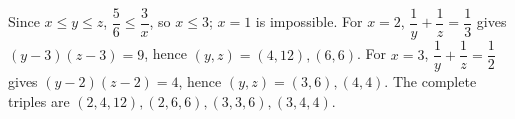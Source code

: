 Since $x\le y\le z$, $\dfrac{5}{6}\le\dfrac{3}{x}$, so $x\le3$; $x=1$ is impossible. For $x=2$, $\dfrac{1}{y}+\dfrac{1}{z}=\dfrac{1}{3}$ gives $(y-3)(z-3)=9$, hence $(y,z)=(4,12),(6,6)$. For $x=3$, $\dfrac{1}{y}+\dfrac{1}{z}=\dfrac{1}{2}$ gives $(y-2)(z-2)=4$, hence $(y,z)=(3,6),(4,4)$. The complete triples are $\boxed{(2,4,12),(2,6,6),(3,3,6),(3,4,4)}$.
